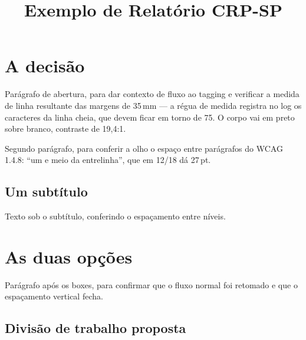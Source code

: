 \documentclass[interno]{crpsp-relatorio}
\title{Exemplo de Relatório CRP-SP}
\author{}
\date{}
\begin{document}
\section{A decisão}

Parágrafo de abertura, para dar contexto de fluxo ao tagging e
verificar a medida de linha resultante das margens de 35\,mm — a
régua de medida registra no log os caracteres da linha cheia, que
devem ficar em torno de 75. O corpo vai em preto sobre branco,
contraste de 19,4:1.

Segundo parágrafo, para conferir a olho o espaço entre parágrafos do
WCAG 1.4.8: “um e meio da entrelinha”, que em 12/18 dá 27\,pt.

\subsection{Um subtítulo}

Texto sob o subtítulo, conferindo o espaçamento entre níveis.

\section{As duas opções}

\begin{paralelos}
\end{paralelos}

Parágrafo após os boxes, para confirmar que o fluxo normal foi
retomado e que o espaçamento vertical fecha.

\subsection{Divisão de trabalho proposta}
\end{document}
